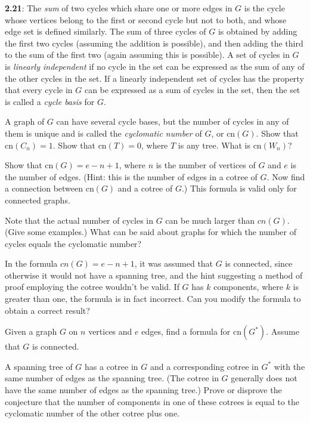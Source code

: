\documentclass{article}
\begin{document}
\vspace{0.5cm}

\textbf{2.21}: The \emph{sum} of two cycles which share one or more edges in $G$ is the cycle whose vertices belong to the first or second cycle but not to both, and whose edge set is defined similarly. The sum of three cycles of $G$ is obtained by adding the first two cycles (assuming the addition is possible), and then adding the third to the sum of the first two (again assuming this is possible). A set of cycles in $G$ is \emph{linearly independent} if no cycle in the set can be expressed as the sum of any of the other cycles in the set. If a linearly independent set of cycles has the property that every cycle in $G$ can be expressed as a sum of cycles in the set, then the set is called a \emph{cycle basis} for $G$.

A graph of $G$ can have several cycle bases, but the number of cycles in any of them is unique and is called the \emph{cyclomatic number} of $G$, or $\text{cn}(G)$. Show that $\text{cn}(C_n)=1$. Show that $\text{cn}(T)=0$, where $T$ is any tree. What is $\text{cn}(W_n)$?

Show that $\text{cn}(G)=e-n+1$, where $n$ is the number of vertices of $G$ and $e$ is the number of edges. (Hint: this is the number of edges in a cotree of $G$. Now find a connection between $\text{cn}(G)$ and a cotree of $G$.) This formula is valid only for connected graphs.

Note that the actual number of cycles in $G$ can be much larger than $cn(G)$. (Give some examples.) What can be said about graphs for which the number of cycles equals the cyclomatic number?

In the formula $cn(G)=e-n+1$, it was assumed that $G$ is connected, since otherwise it would not have a spanning tree, and the hint suggesting a method of proof employing the cotree wouldn't be valid. If $G$ has $k$ components, where $k$ is greater than one, the formula is in fact incorrect. Can you modify the formula to obtain a correct result?

Given a graph $G$ on $n$ vertices and $e$ edges, find a formula for $\text{cn}(G^*)$. Assume that $G$ is connected.

A spanning tree of $G$ has a cotree in $G$ and a corresponding cotree in $G^*$ with the same number of edges as the spanning tree. (The cotree in $G$ generally does not have the same number of edges as the spanning tree.) Prove or disprove the conjecture that the number of components in one of these cotrees is equal to the cyclomatic number of the other cotree plus one.
\end{document}
